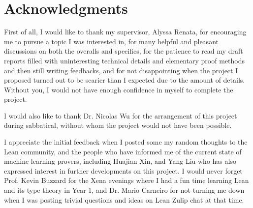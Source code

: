 \documentclass[twoside]{report}
\begin{document}


\begin{abstract}
    Due to their expressivity and the Curry-Howard correspondence with functional programs, dependent type theories have become the logical bases of many modern interactive theorem provers. However, such expressivity comes with complications in proof automation. For decades, efficient proof systems aimed at automation, in particular the connection method, have only been proposed and studied for simpler, proof-irrelevant, and mostly first-order logics. We demonstrated its generalisation to a fragment of the extended calculus of constructions (ECC), thereby moving towards a class of sound, complete and efficient proof search methods in the dependent type theory.
\end{abstract}

\chapter*{Acknowledgments}
\label{sec:acknowledgements}
\thispagestyle{empty}

First of all, I would like to thank my supervisor, Alyssa Renata, for encouraging me to pursue a topic I was interested in, for many helpful and pleasant discussions on both the overalls and specifics, for the patience to read my draft reports filled with uninteresting technical details and elementary proof methods and then still writing feedbacks, and for not disappointing when the project I proposed turned out to be scarier than I expected due to the amount of details. Without you, I would not have enough confidence in myself to complete the project.

I would also like to thank Dr. Nicolas Wu for the arrangement of this project during sabbatical, without whom the project would not have been possible.

I appreciate the initial feedback when I posted some my random thoughts to the Lean community, and the people who have informed me of the current state of machine learning provers, including Huajian Xin, and Yang Liu who has also expressed interest in further developments on this project. I would never forget Prof. Kevin Buzzard for the Xena evenings where I had a fun time learning Lean and its type theory in Year 1, and Dr. Mario Carneiro for not turning me down when I was posting trivial questions and ideas on Lean Zulip chat at that time.
\end{document}
